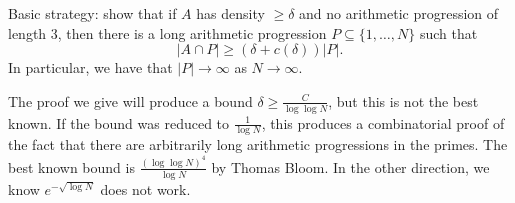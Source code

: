 \documentclass{article}
\newcommand{\1}[1]{\mathbbm{1}_{#1}}
\begin{document}
Basic strategy: show that if $A$ has density $\geq \delta$ and no arithmetic progression of length 3, then there is a long arithmetic progression $P \subseteq \{1, \dotsc, N\}$ such that
\begin{equation*}
  |A \cap P| \geq (\delta + c(\delta)) |P|.
\end{equation*}
In particular, we have that $|P| \to \infty$ as $N \to \infty$.

The proof we give will produce a bound $\delta \geq \frac{C}{\log \log N}$, but this is not the best known.
If the bound was reduced to $\frac{1}{\log N}$, this produces a combinatorial proof of the fact that there are arbitrarily long arithmetic progressions in the primes.
The best known bound is $\frac{(\log \log N)^4}{\log N}$ by Thomas Bloom.
In the other direction, we know $e^{- \sqrt{\log N}}$ does not work.
\end{document}

